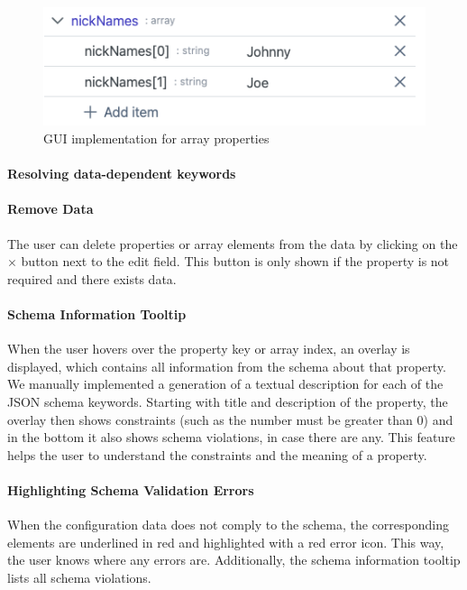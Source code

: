 \begin{figure}[!t]
    \centering
    \includegraphics[width=\columnwidth]{figures/gui_element_array}
    \caption{GUI implementation for array properties}
    \label{fig:gui_element_array}
\end{figure}




\paragraph{Resolving data-dependent keywords}


\paragraph{Remove Data}
The user can delete properties or array elements from the data by clicking on the $\times$ button next to the edit field.
This button is only shown if the property is not required and there exists data.

\paragraph{Schema Information Tooltip}
When the user hovers over the property key or array index, an overlay is displayed, which contains all information from the schema about that property.
We manually implemented a generation of a textual description for each of the JSON schema keywords.
Starting with title and description of the property, the overlay then shows constraints (such as the number must be greater than 0) and in the bottom it also shows schema violations, in case there are any.
This feature helps the user to understand the constraints and the meaning of a property.


\paragraph{Highlighting Schema Validation Errors}
When the configuration data does not comply to the schema, the corresponding elements are underlined in red and highlighted with a red error icon.
This way, the user knows where any errors are.
Additionally, the schema information tooltip lists all schema violations.

